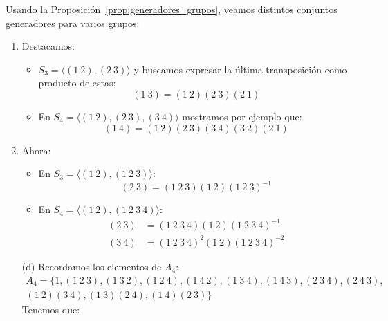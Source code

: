 \begin{ejemplo}
    Usando la Proposición~\ref{prop:generadores_grupos}, veamos distintos conjuntos generadores para varios grupos:
    \begin{enumerate}[label=(\alph*)]
        \item Destacamos:
        \begin{itemize}
            \item $S_3 = \langle (1\ 2), (2\ 3) \rangle $ y buscamos expresar la última transposición como producto de estas:
                \begin{equation*}
                    (1\ 3) = (1\ 2)(2\ 3)(2\ 1)
                \end{equation*}
            \item En $S_4 = \langle (1\ 2),(2\ 3),(3\ 4) \rangle $ mostramos por ejemplo que:
                \begin{equation*}
                    (1\ 4) = (1\ 2)(2\ 3)(3\ 4)(3\ 2)(2\ 1)
                \end{equation*}
        \end{itemize}
        \item Ahora:
            \begin{itemize}
                \item En $S_3 = \langle (1\ 2), (1\ 2\ 3) \rangle $:
                    \begin{equation*}
                        (2\ 3) = (1\ 2\ 3)(1\ 2){(1\ 2\ 3)}^{-1}
                    \end{equation*}
                \item En $S_4 = \langle (1\ 2), (1\ 2\ 3\ 4) \rangle $:
                    \begin{align*}
                        (2\ 3) &= (1\ 2\ 3\ 4)(1\ 2){(1\ 2\ 3\ 4)}^{-1} \\
                        (3\ 4) &= {(1\ 2\ 3\ 4)}^{2}(1\ 2){(1\ 2\ 3\ 4)}^{-2}
                    \end{align*}
            \end{itemize}
        \item[(d)] Recordamos los elementos de $A_4$:
                \begin{multline*}
                     A_4 = \{ 1, (1\ 2\ 3), (1\ 3\ 2), (1\ 2\ 4), (1\ 4\ 2), (1\ 3\ 4), (1\ 4\ 3), (2\ 3\ 4), (2\ 4\ 3),\\ (1\ 2)(3\ 4), (1\ 3)(2\ 4), (1\ 4)(2\ 3) \} 
                \end{multline*}
                Tenemos que:
                \begin{equation*}

\end{equation*}
\end{enumerate}
\end{ejemplo}
